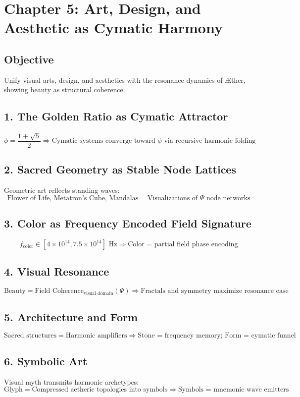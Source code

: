 \documentclass[12pt]{book}
\begin{document}
\section*{Chapter 5: Art, Design, and Aesthetic as Cymatic Harmony}

\subsection*{Objective}
Unify visual arts, design, and aesthetics with the resonance dynamics of Æther, showing beauty as structural coherence.

\subsection*{1. The Golden Ratio as Cymatic Attractor}
\[
\phi = \frac{1 + \sqrt{5}}{2}
\Rightarrow \text{Cymatic systems converge toward } \phi \text{ via recursive harmonic folding}
\]

\subsection*{2. Sacred Geometry as Stable Node Lattices}
Geometric art reflects standing waves:
\[
\text{Flower of Life, Metatron’s Cube, Mandalas} = \text{Visualizations of $\Psi$ node networks}
\]

\subsection*{3. Color as Frequency Encoded Field Signature}
\[
f_{\text{color}} \in [4 \times 10^{14}, 7.5 \times 10^{14}] \text{ Hz}
\Rightarrow \text{Color = partial field phase encoding}
\]

\subsection*{4. Visual Resonance}
\[
\text{Beauty} = \text{Field Coherence}_{\text{visual domain}}(\Psi)
\Rightarrow \text{Fractals and symmetry maximize resonance ease}
\]

\subsection*{5. Architecture and Form}
\[
\text{Sacred structures} = \text{Harmonic amplifiers}
\Rightarrow \text{Stone = frequency memory; Form = cymatic funnel}
\]

\subsection*{6. Symbolic Art}
Visual myth transmits harmonic archetypes:
\[
\text{Glyph} = \text{Compressed aetheric topologies into symbols}
\Rightarrow \text{Symbols = mnemonic wave emitters}
\]
\end{document}

